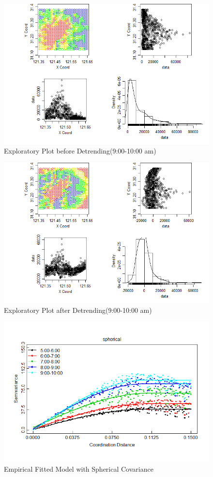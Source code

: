 \documentclass[hidelinks,12pt]{article}
\begin{document}
\FloatBarrier
\begin{figure}[!ht]
	\includegraphics[width=\textwidth]{geo9.png}
	\caption{Exploratory Plot before Detrending(9:00-10:00 am) \label{fig:geo9}}
\end{figure}
\FloatBarrier
\begin{figure}[!ht]
	\includegraphics[width=\textwidth]{gres9.png}
	\caption{Exploratory Plot after Detrending(9:00-10:00 am)\label{fig:gres9}}
\end{figure}
\FloatBarrier
	\begin{figure}[!ht]
		\includegraphics[width=\textwidth]{semfit_spherical.png}
		\caption{Empirical Fitted Model with Spherical Covariance \label{fig:semsph}}
	\end{figure}
\end{document}
